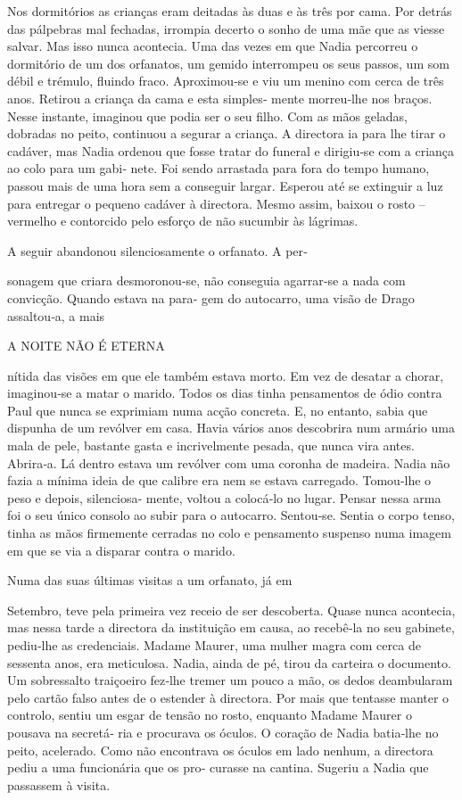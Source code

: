 Nos dormitórios as crianças eram deitadas às duas e às três por cama.
Por detrás das pálpebras mal fechadas, irrompia decerto o sonho de uma
mãe que as viesse salvar. Mas isso nunca acontecia. Uma das vezes em que
Nadia percorreu o dormitório de um dos orfanatos, um gemido interrompeu
os seus passos, um som débil e trémulo, fluindo fraco. Aproximou‑se e
viu um menino com cerca de três anos. Retirou a criança da cama e esta
simples‑ mente morreu‑lhe nos braços. Nesse instante, imaginou que podia
ser o seu filho. Com as mãos geladas, dobradas no peito, continuou a
segurar a criança. A directora ia para lhe tirar o cadáver, mas Nadia
ordenou que fosse tratar do funeral e dirigiu‑se com a criança ao colo
para um gabi‑ nete. Foi sendo arrastada para fora do tempo humano,
passou mais de uma hora sem a conseguir largar. Esperou até se extinguir
a luz para entregar o pequeno cadáver à directora. Mesmo assim, baixou o
rosto -- vermelho e contorcido pelo esforço de não sucumbir às lágrimas.

A seguir abandonou silenciosamente o orfanato. A per‑

sonagem que criara desmoronou‑se, não conseguia agarrar‑se a nada com
convicção. Quando estava na para‑ gem do autocarro, uma visão de Drago
assaltou‑a, a mais

A NOITE NÃO É ETERNA

nítida das visões em que ele também estava morto. Em vez de desatar a
chorar, imaginou‑se a matar o marido. Todos os dias tinha pensamentos de
ódio contra Paul que nunca se exprimiam numa acção concreta. E, no
entanto, sabia que dispunha de um revólver em casa. Havia vários anos
descobrira num armário uma mala de pele, bastante gasta e incrivelmente
pesada, que nunca vira antes. Abrira‑a. Lá dentro estava um revólver com
uma coronha de madeira. Nadia não fazia a mínima ideia de que calibre
era nem se estava carregado. Tomou‑lhe o peso e depois, silenciosa‑
mente, voltou a colocá‑lo no lugar. Pensar nessa arma foi o seu único
consolo ao subir para o autocarro. Sentou‑se. Sentia o corpo tenso,
tinha as mãos firmemente cerradas no colo e pensamento suspenso numa
imagem em que se via a disparar contra o marido.

Numa das suas últimas visitas a um orfanato, já em

Setembro, teve pela primeira vez receio de ser descoberta. Quase nunca
acontecia, mas nessa tarde a directora da instituição em causa, ao
recebê‑la no seu gabinete, pediu‑lhe as credenciais. Madame Maurer, uma
mulher magra com cerca de sessenta anos, era meticulosa. Nadia, ainda de
pé, tirou da carteira o documento. Um sobressalto traiçoeiro fez‑lhe
tremer um pouco a mão, os dedos deambularam pelo cartão falso antes de o
estender à directora. Por mais que tentasse manter o controlo, sentiu um
esgar de tensão no rosto, enquanto Madame Maurer o pousava na secretá‑
ria e procurava os óculos. O coração de Nadia batia‑lhe no peito,
acelerado. Como não encontrava os óculos em lado nenhum, a directora
pediu a uma funcionária que os pro‑ curasse na cantina. Sugeriu a Nadia
que passassem à visita.

